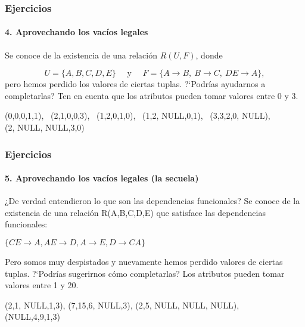 \begin{frame}
    \frametitle{Ejercicios}
    \framesubtitle{4. Aprovechando los vac\'ios legales}

    Se conoce de la existencia de una relación $R(U, F)$, donde 

    $$U = \{A,B,C,D,E\} \quad \textrm{ y } \quad F = \{ A \rightarrow B, \ B \rightarrow C, \ DE \rightarrow A \},$$
    pero hemos perdido los valores de ciertas tuplas. ?`Podr\'ias ayudarnos a completarlas? Ten en cuenta que los atributos pueden tomar valores entre 0 y 3.

    \begin{center}
        (0,0,0,1,1), \ (2,1,0,0,3), \ (1,2,0,1,0), \ (1,2, NULL,0,1), \ (3,3,2,0, NULL),\\ (2, NULL, NULL,3,0) 
    \end{center}

\end{frame}

\begin{frame}
    \frametitle{Ejercicios}
    \framesubtitle{5. Aprovechando los vac\'ios legales (la secuela)}

    ¿De verdad entendieron lo que son las dependencias funcionales? Se conoce de la existencia de una relación R(A,B,C,D,E) que satisface las dependencias funcionales:

    $\{ CE \rightarrow A, AE \rightarrow D, A \rightarrow E, D \rightarrow CA \}$

    Pero somos muy despistados y nuevamente hemos perdido valores de ciertas tuplas. ?`Podr\'ias sugerirnos cómo completarlas? Los atributos pueden tomar valores entre 1 y 20.


    \begin{center}
        (2,1, NULL,1,3), (7,15,6, NULL,3), (2,5, NULL, NULL, NULL),\\
        (NULL,4,9,1,3)  
    \end{center}

\end{frame}